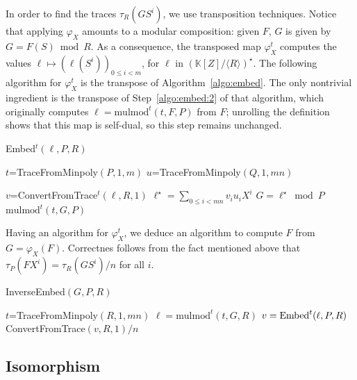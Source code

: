 \documentclass[12pt]{article}
\def\K {\ensuremath{\mathbb{K}}}
\def\mulmod {\ensuremath{\mathrm{mulmod}}}
\begin{document}
In order to find the traces $\tau_R(G S^i)$, we use transposition
techniques. Notice that applying $\varphi_X$ amounts to a modular
composition: given $F$, $G$ is given by $G= F(S) \bmod R$. As a
consequence, the transposed map $\varphi_X^t$ computes the values
$\ell \mapsto (\ell(S^i))_{0 \le i < m}$, for $\ell$ in
$(\K[Z]/\langle R \rangle)^\star$. The following algorithm for
$\varphi_X^t$ is the transpose of Algorithm~\ref{algo:embed}. The only
nontrivial ingredient is the transpose of Step~\ref{algo:embed:2} of
that algorithm, which originally computes $\ell= \mulmod^t(t,F,P)$
from $F$; unrolling the definition shows that this map is self-dual,
so this step remains unchanged.

\begin{algorithm}[H]
  \caption{Embed$^t(\ell,P,R)$}
  \begin{algorithmic}[1]
  \STATE $t$=TraceFromMinpoly$(P,1,m)$
  \STATE $u$=TraceFromMinpoly$(Q,1,mn)$

  \STATE $v$=ConvertFromTrace$^t(\ell, R, 1)$
  \STATE $\ell^\star=\sum_{0 \le i < mn} v_i u_i X^i$
  \STATE $G = \ell^\star \bmod P$
  \RETURN $\mulmod^t(t,G,P)$
  \end{algorithmic}
\end{algorithm}

Having an algorithm for $\varphi_X^t$, we deduce an algorithm to
compute $F$ from $G=\varphi_X(F)$. Correctnes follows from the fact
mentioned above that $\tau_P(F X^i) =\tau_R(G S^i)/n$ for all $i$.

\begin{algorithm}[H]
  \caption{InverseEmbed$(G,P,R)$}
  \begin{algorithmic}[1]
  \STATE $t$=TraceFromMinpoly$(R,1,mn)$
  \STATE $\ell = \mulmod^t(t,G,R)$
  \STATE $v={\rm Embed}^t(\ell,P,R)$
  \RETURN ConvertFromTrace$(v, R, 1)/n$
  \end{algorithmic}
\end{algorithm}


\subsection{Isomorphism} 






 

\end{document}
